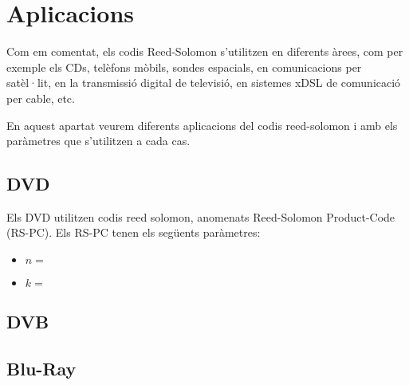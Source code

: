 \section{Aplicacions}
Com em comentat, els codis Reed-Solomon s'utilitzen en diferents àrees, com per
exemple els CDs, telèfons mòbils, sondes espacials, en comunicacions per
satèl·lit, en la transmissió digital de televisió, en sistemes xDSL de
comunicació per cable, etc.

En aquest apartat veurem diferents aplicacions del codis reed-solomon
i amb els paràmetres que s'utilitzen a cada cas. 

\subsection{DVD}
Els DVD utilitzen codis reed solomon, anomenats Reed-Solomon Product-Code
(RS-PC). Els RS-PC tenen els següents paràmetres: 

\begin{itemize}
 \item $n = $
 \item $k = $ 
\end{itemize}


      


\subsection{DVB}

\subsection{Blu-Ray}